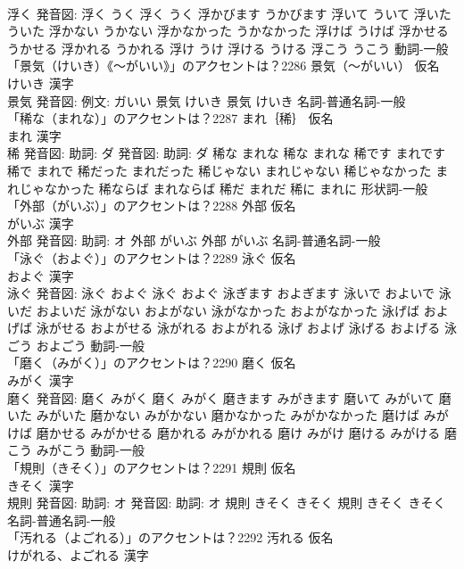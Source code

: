 \documentclass[8pt]{extreport}
\begin{document}
\begin{CJK}{UTF8}{min}
\\	浮く 発音図:	浮く うく		浮く うく 浮かびます うかびます 浮いて ういて 浮いた ういた 浮かない うかない 浮かなかった うかなかった 浮けば うけば 浮かせる うかせる 浮かれる うかれる 浮け うけ 浮ける うける 浮こう うこう				動詞-一般 
\\	「景気（けいき）《〜がいい》」のアクセントは？2286	景気（〜がいい） 仮名　
\\	けいき 漢字　
\\	景気 発音図: 例文: ガいい	景気 けいき		景気 けいき				名詞-普通名詞-一般 
\\	「稀な（まれな）」のアクセントは？2287	まれ｛稀｝ 仮名　
\\	まれ 漢字　
\\	稀 発音図: 助詞: ダ 発音図: 助詞: ダ	稀な まれな		稀な まれな 稀です まれです 稀で まれで 稀だった まれだった 稀じゃない まれじゃない 稀じゃなかった まれじゃなかった 稀ならば まれならば 稀だ まれだ 稀に まれに				形状詞-一般 
\\	「外部（がいぶ）」のアクセントは？2288	外部 仮名　
\\	がいぶ 漢字　
\\	外部 発音図: 助詞: オ	外部 がいぶ		外部 がいぶ				名詞-普通名詞-一般 
\\	「泳ぐ（およぐ）」のアクセントは？2289	泳ぐ 仮名　
\\	およぐ 漢字　
\\	泳ぐ 発音図:	泳ぐ およぐ		泳ぐ およぐ 泳ぎます およぎます 泳いで およいで 泳いだ およいだ 泳がない およがない 泳がなかった およがなかった 泳げば およげば 泳がせる およがせる 泳がれる およがれる 泳げ およげ 泳げる およげる 泳ごう およごう				動詞-一般 
\\	「磨く（みがく）」のアクセントは？2290	磨く 仮名　
\\	みがく 漢字　
\\	磨く 発音図:	磨く みがく		磨く みがく 磨きます みがきます 磨いて みがいて 磨いた みがいた 磨かない みがかない 磨かなかった みがかなかった 磨けば みがけば 磨かせる みがかせる 磨かれる みがかれる 磨け みがけ 磨ける みがける 磨こう みがこう				動詞-一般 
\\	「規則（きそく）」のアクセントは？2291	規則 仮名　
\\	きそく 漢字　
\\	規則 発音図: 助詞: オ 発音図: 助詞: オ	規則 きそく きそく		規則 きそく きそく				名詞-普通名詞-一般 
\\	「汚れる（よごれる）」のアクセントは？2292	汚れる 仮名　
\\	けがれる、よごれる 漢字　

\end{CJK}
\end{document}
